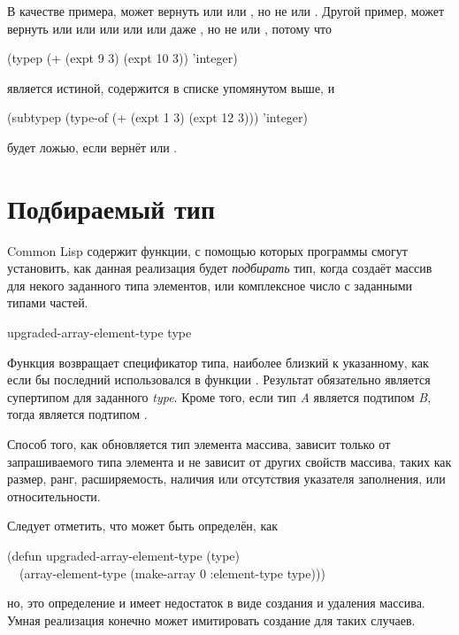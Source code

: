 \begin{defun}[Функция]
В качестве примера,  может вернуть
 или  или , но не
 или .
Другой пример,  может вернуть  или 
или  или  или  или даже , но не  или , потому что
\begin{lisp}
(typep (+ (expt 9 3) (expt 10 3)) 'integer)
\end{lisp}

является истиной,  содержится в списке упомянутом выше, и 

\begin{lisp}
(subtypep (type-of (+ (expt 1 3) (expt 12 3))) 'integer)
\end{lisp}

будет ложью, если  вернёт  или .

\end{defun}

\section{Подбираемый тип}

Common Lisp содержит функции, с помощью которых программы смогут установить, как
данная реализация будет \emph{подбирать} тип, когда создаёт массив для некого
заданного типа элементов, или комплексное число с заданными типами частей.

\begin{defun}[Функция]
upgraded-array-element-type type

Функция возвращает спецификатор типа, наиболее близкий к указанному, как если бы
последний использовался в функции .
Результат обязательно является супертипом для заданного \emph{type}.
Кроме того, если тип \emph{A} является подтипом \emph{B}, тогда 
 является подтипом
.

Способ того, как обновляется тип элемента массива, зависит только от запрашиваемого
типа элемента и не зависит от других свойств массива, таких как размер, ранг, 
расширяемость, наличия или отсутствия указателя заполнения, или относительности.

Следует отметить, что  может быть определён,
как
\begin{lisp}
(defun upgraded-array-element-type (type) \\
~~(array-element-type (make-array 0 :element-type type)))
\end{lisp}
но, это определение и имеет недостаток в виде создания и удаления массива. Умная
реализация конечно может имитировать создание для таких случаев.
\end{defun}


